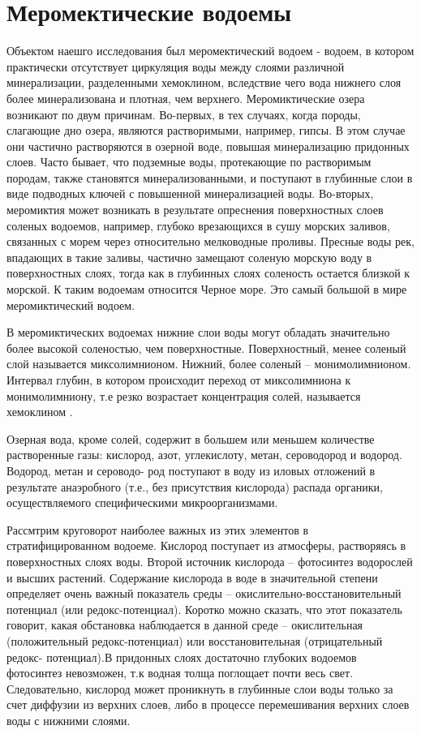 \section{Меромектические водоемы}
Объектом наешго исследования был меромектический водоем - водоем, в котором практически
отсутствует циркуляция воды между слоями различной минерализации, разделенными хемоклином, вследствие чего вода нижнего слоя более минерализована и плотная, чем верхнего.
Меромиктические озера возникают по двум причинам. Во-первых, в тех случаях, когда породы, слагающие дно озера, являются растворимыми, например, гипсы. В этом случае они
частично растворяются в озерной воде, повышая минерализацию придонных слоев. Часто
бывает, что подземные воды, протекающие по растворимым породам, также становятся минерализованными, и поступают в глубинные слои в виде подводных ключей с повышенной
минерализацией воды. Во-вторых, меромиктия может возникать в результате опреснения
поверхностных слоев соленых водоемов, например, глубоко врезающихся в сушу морских
заливов, связанных с морем через относительно мелководные проливы. Пресные воды рек, впадающих в такие заливы, частично замещают соленую морскую воду в поверхностных слоях, тогда как в глубинных слоях соленость остается близкой к морской. К таким водоемам относится Черное море. Это самый большой в мире меромиктический водоем.

В меромиктических водоемах нижние слои воды могут обладать значительно более высокой соленостью, чем поверхностные. Поверхностный, менее соленый слой называется миксолимнионом. Нижний, более соленый – монимолимнионом. Интервал глубин, в котором происходит переход от миксолимниона к монимолимниону, т.е резко возрастает концентрация
солей, называется хемоклином \cite{BioPhys10}.

Озерная вода, кроме солей, содержит в большем или меньшем количестве растворенные
газы: кислород, азот, углекислоту, метан, сероводород и водород. Водород, метан и сероводо-
род поступают в воду из иловых отложений в результате анаэробного (т.е., без присутствия
кислорода) распада органики, осуществляемого специфическими микроорганизмами.

Рассмтрим круговорот наиболее важных из этих элементов в стратифицированном водоеме. Кислород поступает из атмосферы, растворяясь в поверхностных слоях воды. Второй
источник кислорода – фотосинтез водорослей и высших растений. Содержание кислорода в воде в значительной степени определяет очень важный показатель среды – окислительно-восстановительный потенциал (или редокс-потенциал). Коротко можно сказать, что этот показатель говорит, какая обстановка
наблюдается в данной среде – окислительная (положительный редокс-потенциал) или восстановительная (отрицательный редокс- потенциал).В придонных слоях достаточно глубоких
водоемов фотосинтез невозможен, т.к водная толща поглощает почти весь свет. Следовательно, кислород может проникнуть в глубинные слои воды только за счет диффузии из верхних
слоев, либо в процессе перемешивания верхних слоев воды с нижними слоями.

